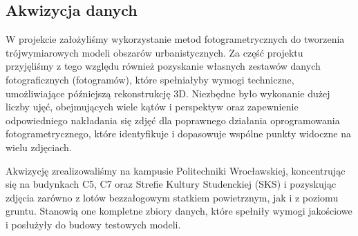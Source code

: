 \subsection{Akwizycja danych}
W projekcie założyliśmy wykorzystanie metod fotogrametrycznych do tworzenia trójwymiarowych modeli 
obszarów urbanistycznych. Za część projektu przyjęliśmy z tego względu również pozyskanie własnych zestawów 
danych fotograficznych (fotogramów), które spełniałyby wymogi techniczne, umożliwiające późniejszą 
rekonstrukcję 3D. Niezbędne było wykonanie dużej liczby ujęć, obejmujących wiele kątów i perspektyw oraz 
zapewnienie odpowiedniego nakładania się zdjęć dla poprawnego działania oprogramowania fotogrametrycznego, 
które identyfikuje i dopasowuje wspólne punkty widoczne na wielu zdjęciach.

Akwizycję zrealizowaliśmy na kampusie Politechniki Wrocławskiej, koncentrując się na budynkach C5, C7 oraz 
Strefie Kultury Studenckiej (SKS) i pozyskując zdjęcia zarówno z lotów bezzałogowym statkiem powietrznym, 
jak i z poziomu gruntu. Stanowią one kompletne zbiory danych, które spełniły wymogi jakościowe 
i posłużyły do budowy testowych modeli. 

